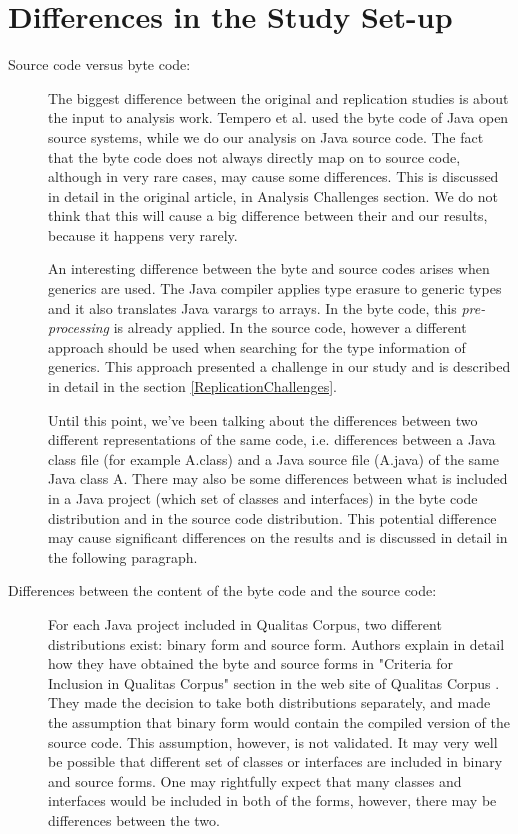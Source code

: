 \documentclass{uvamscse}
\begin{document}
\section{Differences in the Study Set-up}
\begin{description}

\item[Source code versus byte code:] The biggest difference between the original and replication studies is about the input to analysis work. Tempero et al. used the byte code of Java open source systems, while we do our analysis on Java source code. The fact that the byte code does not always directly map on to source code, although in very rare cases, may cause some differences. This is discussed in detail in the original article, in Analysis Challenges section. We do not think that this will cause a big difference between their and our results, because it happens very rarely. 

An interesting difference between the byte and source codes arises when generics are used. The Java compiler applies type erasure to generic types and it also translates Java varargs to arrays. In the byte code, this \emph{pre-processing} is already applied. In the source code, however a different approach should be used when searching for the type information of generics. This approach presented a challenge in our study and is described in detail in the section \ref{ReplicationChallenges}.

Until this point, we've been talking about the differences between two different representations of the same code, i.e. differences between a Java class file (for example A.class) and a Java source file (A.java) of the same Java class A. There may also be some differences between what is included in a Java project (which set of classes and interfaces) in the byte code distribution and in the source code distribution. This potential difference may cause significant differences on the results and is discussed in detail in the following paragraph.


\item[Differences between the content of the byte code and the source code:] For each Java project included in Qualitas Corpus, two different distributions exist: binary form and source form. Authors explain in detail how they have obtained the byte and source forms in "Criteria for Inclusion in Qualitas Corpus" section in the web site of Qualitas Corpus \cite{QualitasCorpusWeb}. They made the decision to take both distributions separately, and made the assumption that binary form would contain the compiled version of the source code. This assumption, however, is not validated. It may very well be possible that different set of classes or interfaces are included in binary and source forms. One may rightfully expect that many classes and interfaces would be included in both of the forms, however, there may be differences between the two.


\end{description}
\end{document}
